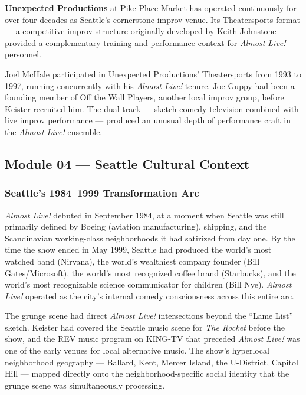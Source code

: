 \documentclass[11pt,letterpaper]{article}
\begin{document}
\textbf{Unexpected Productions} at Pike Place Market has operated continuously for over four decades as Seattle's cornerstone improv venue. Its Theatersports format --- a competitive improv structure originally developed by Keith Johnstone --- provided a complementary training and performance context for \textit{Almost Live!} personnel.

Joel McHale participated in Unexpected Productions' Theatersports from 1993 to 1997, running concurrently with his \textit{Almost Live!} tenure. Joe Guppy had been a founding member of Off the Wall Players, another local improv group, before Keister recruited him. The dual track --- sketch comedy television combined with live improv performance --- produced an unusual depth of performance craft in the \textit{Almost Live!} ensemble.

\subsection{Module 04 --- Seattle Cultural Context}

\subsubsection{Seattle's 1984--1999 Transformation Arc}

\textit{Almost Live!} debuted in September 1984, at a moment when Seattle was still primarily defined by Boeing (aviation manufacturing), shipping, and the Scandinavian working-class neighborhoods it had satirized from day one. By the time the show ended in May 1999, Seattle had produced the world's most watched band (Nirvana), the world's wealthiest company founder (Bill Gates/Microsoft), the world's most recognized coffee brand (Starbucks), and the world's most recognizable science communicator for children (Bill Nye). \textit{Almost Live!} operated as the city's internal comedy consciousness across this entire arc.

The grunge scene had direct \textit{Almost Live!} intersections beyond the ``Lame List'' sketch. Keister had covered the Seattle music scene for \textit{The Rocket} before the show, and the REV music program on KING-TV that preceded \textit{Almost Live!} was one of the early venues for local alternative music. The show's hyperlocal neighborhood geography --- Ballard, Kent, Mercer Island, the U-District, Capitol Hill --- mapped directly onto the neighborhood-specific social identity that the grunge scene was simultaneously processing.
\end{document}
